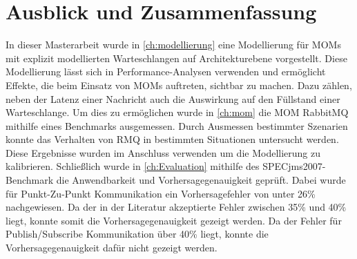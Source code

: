 
\chapter{Ausblick und Zusammenfassung}
\label{ch:zusammenfassung}
In dieser Masterarbeit wurde in \autoref{ch:modellierung} eine Modellierung für MOMs mit explizit modellierten Warteschlangen auf Architekturebene vorgestellt. Diese Modellierung lässt sich in Performance-Analysen verwenden und ermöglicht Effekte, die beim Einsatz von MOMs auftreten, sichtbar zu machen. Dazu zählen, neben der Latenz einer Nachricht auch die Auswirkung auf den Füllstand einer Warteschlange. Um dies zu ermöglichen wurde in \autoref{ch:mom} die MOM RabbitMQ mithilfe eines Benchmarks ausgemessen. Durch Ausmessen bestimmter Szenarien konnte das Verhalten von RMQ in bestimmten Situationen untersucht werden. Diese Ergebnisse wurden im Anschluss verwenden um die Modellierung zu kalibrieren. Schließlich wurde in \autoref{ch:Evaluation} mithilfe des SPECjms2007-Benchmark die Anwendbarkeit und Vorhersagegenauigkeit geprüft. Dabei wurde für Punkt-Zu-Punkt Kommunikation ein Vorhersagefehler von unter 26\% nachgewiesen. Da der in der Literatur akzeptierte Fehler zwischen 35\% und 40\% \cite{error} liegt, konnte somit die Vorhersagegenauigkeit gezeigt werden. Da der Fehler für Publish/Subscribe Kommunikation über 40\% liegt, konnte die Vorhersagegenauigkeit dafür nicht gezeigt werden.\par
